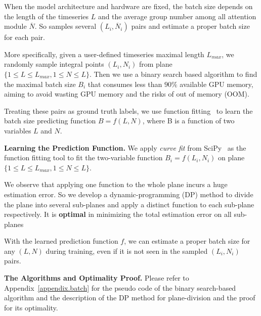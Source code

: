 When the model architecture and hardware are fixed, the batch size depends on the length of the timeseries $L$ and the average group number among all attention module $\overline{N}$. So \system samples several $(L_i,\overline{N}_i)$ pairs and estimate a proper batch size for each pair. 

More specifically, given a user-defined timeseries maximal length $L_{max}$, we randomly sample integral points $(L_i,N_i)$ from plane $\{1 \leq L \leq L_{max}, 1\leq N \leq L\}$. Then we use a binary search based algorithm to find the maximal batch size $B_i$ that consumes less than $90\%$ available GPU memory, aiming to avoid wasting GPU memory and the risks of out of memory (OOM).

Treating these pairs as ground truth labels, we use function fitting~\cite{guest2012numerical} to learn the batch size predicting function $\mathit{B = f(L,N)}$, where B is a function of two variables $L$ and $N$. 


 

\noindent\textbf{Learning the Prediction Function.}
We apply \textit{curve fit} from SciPy~\cite{2020SciPy-NMeth} as the function fitting tool to fit the two-variable function $B_i=f(L_i,N_i)$ on plane $\{1 \leq L \leq L_{max}, 1\leq N \leq L\}$.  

We observe that applying one function to the whole plane incurs a huge estimation error. 
So we develop a dynamic-programming (DP) method to divide the plane into several sub-planes and apply a distinct function to each sub-plane respectively. It is {\bf optimal} in minimizing the total estimation error on all sub-planes

With the learned prediction function $f$, we can estimate a proper batch size for any $(L,N)$ during training, even if it is not seen in the sampled $(L_i,N_i)$ pairs. 

\noindent\textbf{The Algorithms and Optimality Proof.} Please refer to Appendix~\ref{appendix.batch} for the pseudo code of the binary search-based algorithm and the description of the DP method for plane-division and the proof for its optimality.



